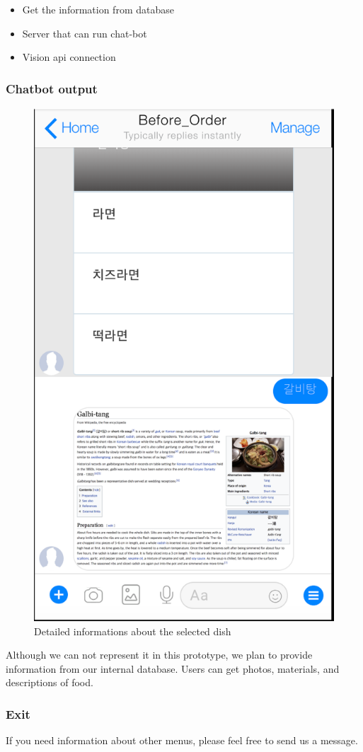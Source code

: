 \begin{itemize}
\item Get the information from database
\item Server that can run chat-bot
\item Vision api connection
\end{itemize}
\FloatBarrier

\subsubsection{Chatbot output}

\begin{figure}[htbp]
\centerline{\includegraphics[width=\linewidth]{./pictures/facebook_dish_information}}
\caption{Detailed informations about the selected dish}
\label{fig:facebook_dish_information}
\end{figure}
\FloatBarrier

Although we can not represent it in this prototype, we plan to provide information from our internal database. Users can get photos, materials, and descriptions of food.

\subsubsection{Exit}
If you need information about other menus, please feel free to send us a message.